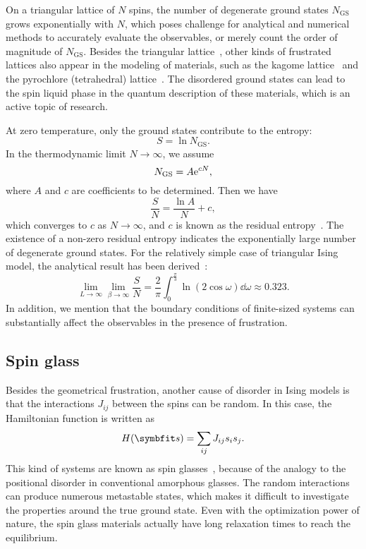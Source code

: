 On a triangular lattice of $N$ spins, the number of degenerate ground states $N_\text{GS}$ grows exponentially with $N$, which poses challenge for analytical and numerical methods to accurately evaluate the observables, or merely count the order of magnitude of $N_\text{GS}$. Besides the triangular lattice~\cite{liu2020intrinsic}, other kinds of frustrated lattices also appear in the modeling of materials, such as the kagome lattice~\cite{wolf1988ising} and the pyrochlore (tetrahedral) lattice~\cite{siddharthan1999ising}. The disordered ground states can lead to the spin liquid phase in the quantum description of these materials, which is an active topic of research.

At zero temperature, only the ground states contribute to the entropy:
\begin{equation}
S = \ln N_\text{GS}.
\end{equation}
In the thermodynamic limit $N \to \infty$, we assume
\begin{equation}
N_\text{GS} = A \mathrm{e}^{c N},
\end{equation}
where $A$ and $c$ are coefficients to be determined. Then we have
\begin{equation}
\frac{S}{N} = \frac{\ln A}{N} + c,
\end{equation}
which converges to $c$ as $N \to \infty$, and $c$ is known as the residual entropy~\cite{wannier1950antiferromagnetism, mambrini1999residual, vanderstraeten2018residual}. The existence of a non-zero residual entropy indicates the exponentially large number of degenerate ground states. For the relatively simple case of triangular Ising model, the analytical result has been derived~\cite{wannier1950antiferromagnetism, wannier1973antiferromagnetism}:
\begin{equation}
\lim_{L \to \infty} \lim_{\beta \to \infty} \frac{S}{N} = \frac{2}{\pi} \int_0^{\frac{\pi}{3}} \ln(2 \cos \omega) \dd \omega \approx 0.323.
\end{equation}
In addition, we mention that the boundary conditions of finite-sized systems can substantially affect the observables in the presence of frustration.

\subsection{Spin glass}
\label{sec:random-interactions}
\label{sec:ea}
\label{sec:sk}

Besides the geometrical frustration, another cause of disorder in Ising models is that the interactions $J_{i j}$ between the spins can be random. In this case, the Hamiltonian function is written as
\begin{equation}
H(\vs) = \sum_{i j} J_{i j} s_i s_j.
\label{eq:cl-ising-general}
\end{equation}
This kind of systems are known as spin glasses~\cite{fischer1993spin, nishimori2001statistical}, because of the analogy to the positional disorder in conventional amorphous glasses. The random interactions can produce numerous metastable states, which makes it difficult to investigate the properties around the true ground state. Even with the optimization power of nature, the spin glass materials actually have long relaxation times to reach the equilibrium.

